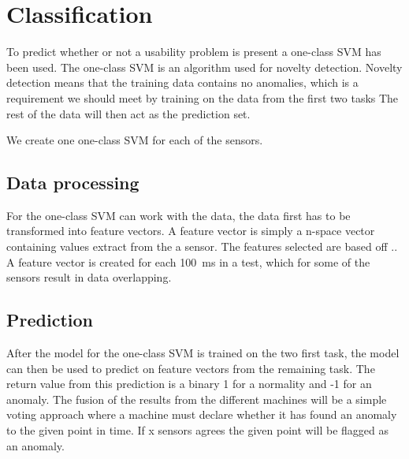 \section{Classification}
To predict whether or not a usability problem is present a one-class SVM has been used.
The one-class SVM is an algorithm used for novelty detection. Novelty detection means that the training data contains no anomalies, which is a requirement we should meet by training on the data from the first two tasks
The rest of the data will then act as the prediction set.

We create one one-class SVM for each of the sensors. 

\subsection{Data processing}
For the one-class SVM can work with the data, the data first has to be transformed into feature vectors.
A feature vector is simply a n-space vector containing values extract from the a sensor.
The features selected are based off .. 
A feature vector is created for each 100~ms in a test, which for some of the sensors result in data overlapping.



\subsection{Prediction}
After the model for the one-class SVM is trained on the two first task, the model can then be used to predict on feature vectors from the remaining task. 
The return value from this prediction is a binary 1 for a normality and -1 for an anomaly.
The fusion of the results from the different machines will be a simple voting approach where a machine must declare whether it has found an anomaly to the  given point in time. If x sensors agrees the given point will be flagged as an anomaly. 
